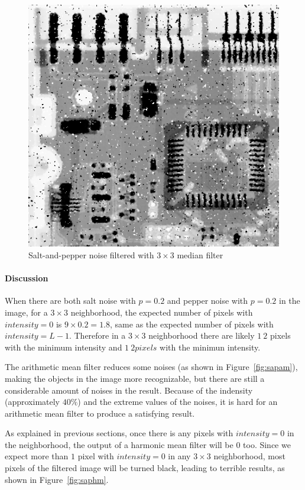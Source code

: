 \documentclass{article}
\begin{document}
\begin{figure}[H]
	\centering
	\includegraphics[width=336pt]{../result/task2/sap/sap-median.png}
	\caption{Salt-and-pepper noise filtered with $3 \times 3$ median filter}
	\label{fig:sapmedian}
\end{figure}

\paragraph{Discussion}

When there are both salt noise with $p = 0.2$ and pepper noise with $p = 0.2$ in the image, for a $3 \times 3$ neighborhood, the expected number of pixels with $intensity = 0$ is $9 \times 0.2 = 1.8$, same as the expected number of pixels with $intensity = L - 1$. Therefore in a $3 \times 3$ neighborhood there are likely $1 ~ 2$ pixels with the minimum intensity and $1 ~ 2 pixels$ with the minimun intensity.

The arithmetic mean filter reduces some noises (as shown in Figure~\ref{fig:sapam}), making the objects in the image more recognizable, but there are still a considerable amount of noises in the result. Because of the indensity (approximately $40\%$) and the extreme values of the noises, it is hard for an arithmetic mean filter to produce a satisfying result.

As explained in previous sections, once there is any pixels with $intensity = 0$ in the neighborhood, the output of a harmonic mean filter will be $0$ too. Since we expect more than $1$ pixel with $intensity = 0$ in any $3 \times 3$ neighborhood, most pixels of the filtered image will be turned black, leading to terrible results, as shown in Figure~\ref{fig:saphm}.
\end{document}
